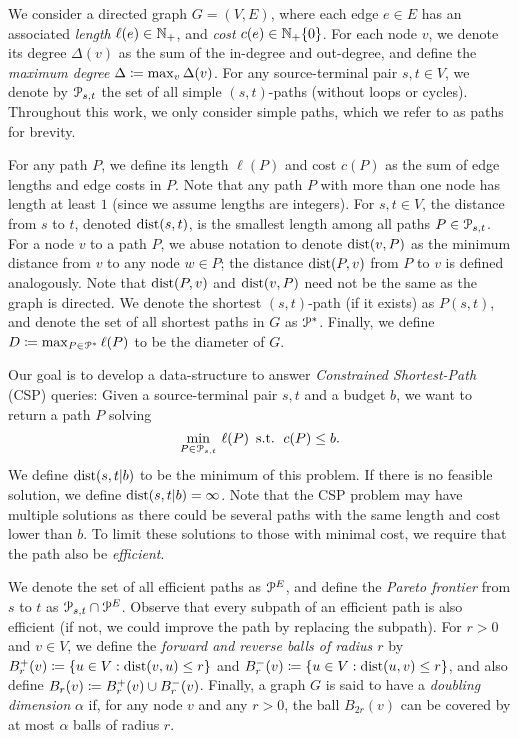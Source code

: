 We consider a directed graph $G=(V,E)$, where each edge $e\in E$ has an associated \emph{length} $\ell(e)\in\mathbb{N}_+$, and \emph{cost} $c(e)\in\mathbb{N}_+\{0\}$.
For each node $v$, we denote its degree $\Delta(v)$ as the sum of the in-degree and out-degree, and define the \emph{maximum degree} $\Delta \coloneqq \max_v\Delta(v)$.
For any source-terminal pair $s,t\in V$, we denote by $\mathcal{P}_{s,t}$ the set of all simple $(s,t)$-paths (without loops or cycles). 
Throughout this work, we only consider simple paths, which we refer to as paths for brevity.

For any path $P$, we define its length $\ell(P)$ and cost $c(P)$ as the sum of edge lengths and edge costs in $P$. 
Note that any path $P$ with more than one node has length at least $1$ (since we assume lengths are integers).
For $s,t\in V$, the distance from $s$ to $t$, denoted $\mbox{dist}(s,t)$, is the smallest length among all paths $P\in\mathcal{P}_{s,t}$.
For a node $v$ to a path $P$, we abuse notation to denote $\mbox{dist}(v,P)$ as the minimum distance from $v$ to any node $w\in P$; the distance $\mbox{dist}(P,v)$ from $P$ to $v$ is defined analogously.
Note that  $\mbox{dist}(P,v)$ and  $\mbox{dist}(v,P)$ need not be the same as the graph is directed.
We denote the shortest $(s,t)$-path (if it exists) as $P(s,t)$, and denote the set of all shortest paths in $G$ as $\mathcal{P}^*$.
Finally, we define $D\coloneqq\max_{P\in\mathcal{P}^*}\ell(P)$ to be the diameter of $G$.

Our goal is to develop a data-structure to answer \emph{Constrained Shortest-Path} (CSP) queries: 
Given a source-terminal pair $s,t$ and a budget $b$, we want to return a path $P$ solving
\[
\min_{P \in \mathcal{P}_{s,t}}  \, \ell(P) \,
\text{ s.t. } \,  c(P) \leq b.
\]
We define $\mbox{dist}(s,t|b)$ to be the minimum of this problem.
If there is no feasible solution, we define $\mbox{dist}(s,t|b)=\infty$.
Note that the CSP problem may have multiple solutions as there could be several paths with the same length and cost lower than $b$.
To limit these solutions to those with minimal cost, we require that the path also be \emph{efficient}. 
We denote the set of all efficient paths as $\mathcal{P}^E$, and define the \emph{Pareto frontier} from $s$ to $t$ as $\mathcal{P}_{s,t}\cap\mathcal{P}^E$.
Observe that every subpath of an efficient path is also efficient (if not, we could improve the path by replacing the subpath).
For $r>0$ and $v\in V$, we define the \emph{forward and reverse balls of radius $r$} by $B^+_r(v)\coloneqq\{u\in V: \mbox{dist}(v,u)\leq r\}$ and $B^-_r(v)\coloneqq\{u\in V: \mbox{dist}(u,v)\leq r\}$, and also define $B_r(v)\coloneqq B^+_r(v)\cup B^-_r(v)$.
Finally, a graph $G$ is said to have a \emph{doubling dimension} $\alpha$ if, for any node $v$ and any $r>0$, the ball $B_{2r}(v)$ can be covered by at most $\alpha$ balls of radius $r$.